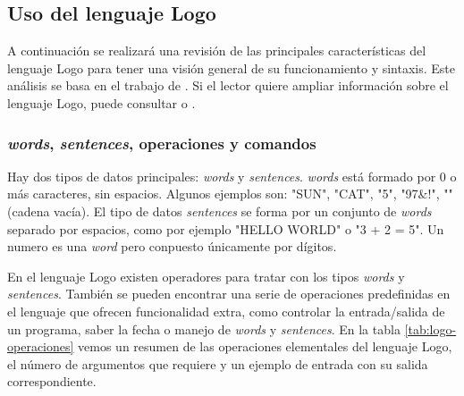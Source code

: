 \subsection{Uso del lenguaje Logo}
\label{sec:logo-lenguaje}

A continuación se realizará una revisión de las principales características del lenguaje Logo para tener una visión general de su funcionamiento y sintaxis. Este análisis se basa en el trabajo de \cite[p.274-305]{feurzeig1969programming}. Si el lector quiere ampliar información sobre el lenguaje Logo, puede consultar \cite{friendly2014advanced} o \cite{logo-resources}.


\subsubsection*{\emph{words}, \emph{sentences}, operaciones y comandos}

Hay dos tipos de datos principales: \emph{words} y \emph{sentences}. \emph{words} está formado por 0 o más caracteres, sin espacios. Algunos ejemplos son: "SUN", "CAT", "5",  "97&!", "" (cadena vacía). El tipo de datos \emph{sentences} se forma por un conjunto de \emph{words} separado por espacios, como por ejemplo "HELLO WORLD" o "3 + 2 = 5". Un numero es una \emph{word} pero conpuesto únicamente por dígitos.

En el lenguaje Logo existen operadores para tratar con los tipos \emph{words} y \emph{sentences}. También se pueden encontrar una serie de operaciones predefinidas en el lenguaje que ofrecen funcionalidad extra, como controlar la entrada/salida de un programa, saber la fecha o manejo de \emph{words} y \emph{sentences}. En la tabla \ref{tab:logo-operaciones} vemos un resumen de las operaciones elementales del lenguaje Logo, el número de argumentos que requiere y un ejemplo de entrada con su salida correspondiente.


